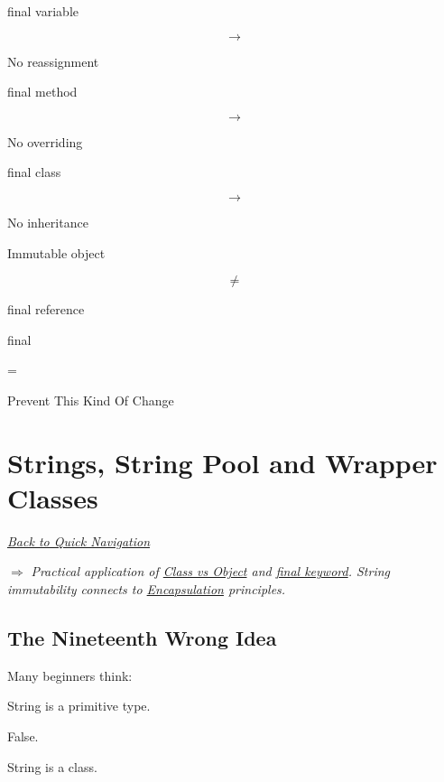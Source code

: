 \documentclass[11pt,a4paper]{book}
\begin{document}
final variable

\[
\rightarrow
\]

No reassignment


final method

\[
\rightarrow
\]

No overriding


final class

\[
\rightarrow
\]

No inheritance


Immutable object

\[
\neq
\]

final reference


final

=

Prevent This Kind Of Change

\chapter{Strings, String Pool and Wrapper Classes}

\smallskip
\noindent
\hyperref[sec:quick_nav]{\emph{Back to Quick Navigation}}

\smallskip
\noindent
\textcolor{RosettaRoyalPurple}{$\Rightarrow$}
\emph{Practical application of \hyperref[chap:class_vs_object]{Class vs Object} and \hyperref[chap:final]{final keyword}. String immutability connects to \hyperref[chap:encapsulation]{Encapsulation} principles.}


\section{The Nineteenth Wrong Idea}

\begin{trap}

Many beginners think:

String is a primitive type.

False.


String is a class.

\end{trap}
\end{document}
